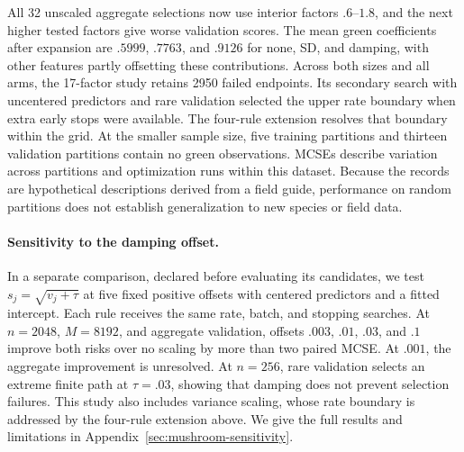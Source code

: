All 32 unscaled aggregate selections now use interior factors $.6$--$1.8$, and
the next higher tested factors give worse validation scores. The mean green
coefficients after expansion are $.5999$, $.7763$, and $.9126$ for none, SD,
and damping, with other features partly offsetting these contributions. Across
both sizes and all arms, the 17-factor study retains 2950 failed endpoints.
Its secondary search with uncentered predictors and rare validation selected the
upper rate boundary when extra early stops were available. The four-rule
extension resolves that boundary within the grid. At the smaller sample size,
five training partitions and thirteen validation partitions contain no green
observations. MCSEs describe variation across partitions and optimization runs
within this dataset. Because the records are hypothetical descriptions derived
from a field guide, performance on random partitions does not establish
generalization to new species or field data.

\paragraph{Sensitivity to the damping offset.}

In a separate comparison, declared before evaluating its candidates, we test
$s_j = \sqrt{v_j + \tau}$ at five fixed positive offsets with centered
predictors and a fitted intercept. Each rule receives the same rate, batch, and
stopping searches. At $n = 2048$, $M = 8192$, and aggregate validation, offsets
$.003$, $.01$, $.03$, and $.1$ improve both risks over no scaling by more than
two paired MCSE. At $.001$, the aggregate improvement is unresolved. At
$n = 256$, rare validation selects an extreme finite path at $\tau = .03$,
showing that damping does not prevent selection failures. This study also
includes variance scaling, whose rate boundary is addressed by the four-rule
extension above. We give the full results and limitations in
Appendix~\ref{sec:mushroom-sensitivity}.
